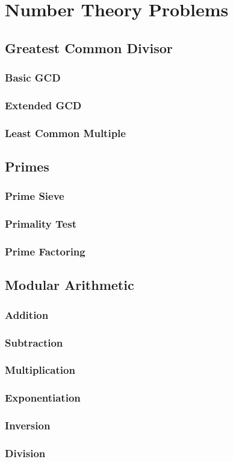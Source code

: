 \section{Number Theory Problems}

\subsection{Greatest Common Divisor}

\subsubsection{Basic GCD}

\subsubsection{Extended GCD}

\subsubsection{Least Common Multiple}

\subsection{Primes}

\subsubsection{Prime Sieve}

\subsubsection{Primality Test}

\subsubsection{Prime Factoring}

\subsection{Modular Arithmetic}

\subsubsection{Addition}

\subsubsection{Subtraction}

\subsubsection{Multiplication}

\subsubsection{Exponentiation}

\subsubsection{Inversion}

\subsubsection{Division}

